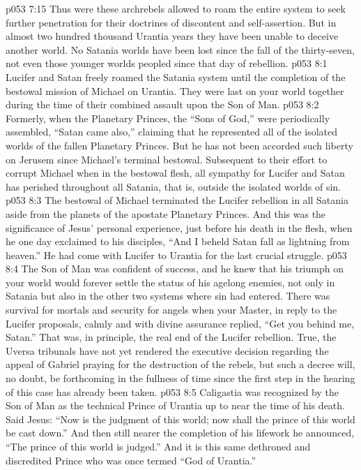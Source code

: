 \vs p053 7:15 Thus were these archrebels allowed to roam the entire system to seek further penetration for their doctrines of discontent and self\hyp{}assertion. But in almost two hundred thousand Urantia years they have been unable to deceive another world. No Satania worlds have been lost since the fall of the thirty\hyp{}seven, not even those younger worlds peopled since that day of rebellion.
\vs p053 8:1 Lucifer and Satan freely roamed the Satania system until the completion of the bestowal mission of Michael on Urantia. They were last on your world together during the time of their combined assault upon the Son of Man.
\vs p053 8:2 Formerly, when the Planetary Princes, the “Sons of God,” were periodically assembled, “Satan came also,” claiming that he represented all of the isolated worlds of the fallen Planetary Princes. But he has not been accorded such liberty on Jerusem since Michael’s terminal bestowal. Subsequent to their effort to corrupt Michael when in the bestowal flesh, all sympathy for Lucifer and Satan has perished throughout all Satania, that is, outside the isolated worlds of sin.
\vs p053 8:3 \pc The bestowal of Michael terminated the Lucifer rebellion in all Satania aside from the planets of the apostate Planetary Princes. And this was the significance of Jesus’ personal experience, just before his death in the flesh, when he one day exclaimed to his disciples, \textcolor{ubdarkred}{“And I beheld Satan fall as lightning from heaven.”} He had come with Lucifer to Urantia for the last crucial struggle.
\vs p053 8:4 The Son of Man was confident of success, and he knew that his triumph on your world would forever settle the status of his agelong enemies, not only in Satania but also in the other two systems where sin had entered. There was survival for mortals and security for angels when your Master, in reply to the Lucifer proposals, calmly and with divine assurance replied, \textcolor{ubdarkred}{“Get you behind me, Satan.”} That was, in principle, the real end of the Lucifer rebellion. True, the Uversa tribunals have not yet rendered the executive decision regarding the appeal of Gabriel praying for the destruction of the rebels, but such a decree will, no doubt, be forthcoming in the fullness of time since the first step in the hearing of this case has already been taken.
\vs p053 8:5 Caligastia was recognized by the Son of Man as the technical Prince of Urantia up to near the time of his death. Said Jesus: \textcolor{ubdarkred}{“Now is the judgment of this world; now shall the prince of this world be cast down.”} And then still nearer the completion of his lifework he announced, \textcolor{ubdarkred}{“The prince of this world is judged.”} And it is this same dethroned and discredited Prince who was once termed “God of Urantia.”
